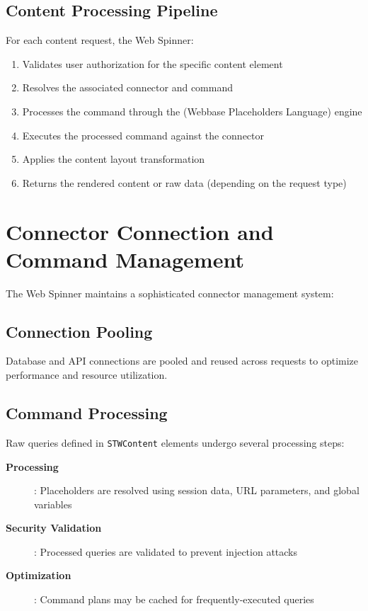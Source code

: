 \subsection{Content Processing Pipeline}

For each content request, the Web Spinner:
\begin{enumerate}
	\item Validates user authorization for the specific content element
	\item Resolves the associated connector and command
	\item Processes the command through the \wbpl{} (Webbase Placeholders Language) engine
	\item Executes the processed command against the connector
	\item Applies the content layout transformation
	\item Returns the rendered content or raw data (depending on the request type)
\end{enumerate}

\section{Connector Connection and Command Management}
\label{sec:connector-management}

The Web Spinner maintains a sophisticated connector management system:

\subsection{Connection Pooling}

Database and API connections are pooled and reused across requests to optimize performance and resource utilization.

\subsection{Command Processing}

Raw queries defined in \texttt{STWContent} elements undergo several processing steps:

\begin{description}
	\item[\textbf{\wbpl{} Processing}]: Placeholders are resolved using session data, URL parameters, and global variables
	\item[\textbf{Security Validation}]: Processed queries are validated to prevent injection attacks
	\item[\textbf{Optimization}]: Command plans may be cached for frequently-executed queries
\end{description}

